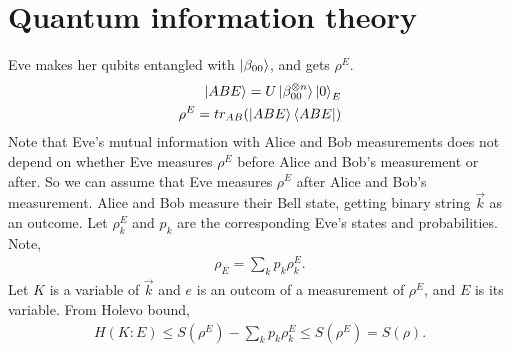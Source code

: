 
\chapter{Quantum information theory}

Eve makes her qubits entangled with $\ket{\beta_{00}}$, and gets $\rho^E$.
\begin{align}
\ket{ABE} = U\ket{\beta_{00}^{\otimes n}}\ket{0}_E\\
\rho^E = tr_{AB} (\ket{ABE} \bra{ABE})
\end{align}
Note that Eve's mutual information with Alice and Bob measurements does not depend on whether Eve measures $\rho^E$ before Alice and Bob's measurement or after.
So we can assume that Eve measures $\rho^E$ after Alice and Bob's measurement.
Alice and Bob measure their Bell state, getting binary string $\vec{k}$ as an outcome.
Let $\rho^E_k$ and $p_k$ are the corresponding Eve's states and probabilities.
Note,
\begin{align}
\rho_E = \sum_k p_k \rho^E_k.
\end{align}
Let $K$ is a variable of $\vec{k}$ and $e$ is an outcom of a measurement of $\rho^E$, and $E$ is its variable.  From Holevo bound, 
\begin{align}
H(K:E) \le S(\rho^E) - \sum_k p_k \rho^E_k \le S(\rho^E) = S(\rho).
\end{align}
